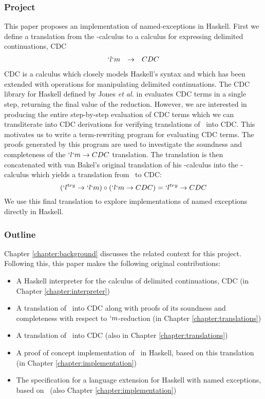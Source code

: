 \subsubsection{Project}
This paper proposes an implementation of named-exceptions in Haskell.
First we define a translation from the \lmu-calculus to a calculus for expressing delimited continuations, CDC \cite{JonesDS07}
\[
\begin{array}{lcr}
  `l`m & \to & CDC
\end{array}
\]
CDC is a calculus which closely models Haskell's syntax and which has been extended with operations for manipulating delimited continuations.
The CDC library for Haskell defined by Jones \emph{et al.} in \cite{JonesDS07} evaluates CDC terms in a single step, returning the final value of the reduction.
However, we are interested in producing the entire step-by-step evaluation of CDC terms which we can transliterate into CDC derivations for verifying translations of \lmu\ into CDC.
This motivates us to write a term-rewriting program for evaluating CDC terms.
The proofs generated by this program are used to investigate the soundness and completeness of the $`l`m \to CDC$ translation.
The translation is then concatenated with van Bakel's original translation of his \ltry-calculus into the \lmu-calculus which yields a translation from \ltry\ to CDC:
\[
   (`l^{try} \to `l`m) \circ (`l`m \to CDC) = `l^{try} \to CDC
\]
We use this final translation to explore implementations of named exceptions directly in Haskell.

\subsubsection{Outline}
Chapter \ref{chapter:background} discusses the related context for this project. Following this, this paper makes the following original contributions:
\begin{itemize}
\item A Haskell interpreter for the calculus of delimited continuations, CDC (in Chapter \ref{chapter:interpreter})
\item A translation of \lmu\ into CDC along with proofs of its soundness and completeness with respect to $`m$-reduction (in Chapter \ref{chapter:translations})
\item A translation of \ltry\ into CDC (also in Chapter \ref{chapter:translations}) 
\item A proof of concept implementation of \ltry\ in Haskell, based on this translation (in Chapter \ref{chapter:implementation})
\item The specification for a language extension for Haskell with named exceptions, based on \ltry\ (also Chapter \ref{chapter:implementation})
\end{itemize}
